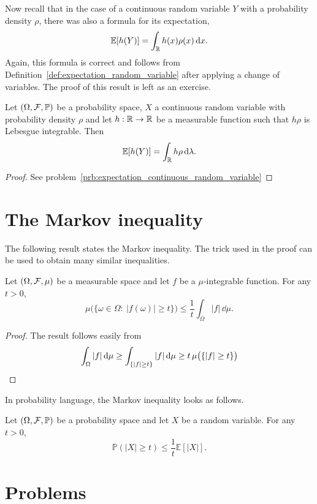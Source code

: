 Now recall that in the case of a continuous random variable $Y$ with a probability density $\rho$, there was also a formula for its expectation,
\[
	\mathbb E[h(Y)] = \int_{\mathbb R} h(x) \rho(x) \, \mathrm{d} x.
\]
Again, this formula is correct and follows from Definition~\ref{def:expectation_random_variable} after applying a change of variables. The proof of this result is left as an exercise.

\begin{lemma}\label{lem:expectation_continuous_random_variable}
Let $(\Omega, \mathcal F, \mathbb{P})$ be a probability space, $X$ a continuous random variable with probability density $\rho$ and let $h : \mathbb R \to \mathbb R$ be a measurable function such that $h \rho$ is Lebesgue integrable. Then
\[
	\mathbb E[h(Y)] = \int_{\mathbb R} h \rho \, \mathrm{d} \lambda.
\]
\end{lemma}

\begin{proof}
See problem~\ref{prb:expectation_continuous_random_variable}
\end{proof}

\section{The Markov inequality}

The following result states the Markov inequality. The trick used in the proof can be used to obtain many similar inequalities.

\begin{lemma}
	Let $(\Omega, \mathcal F, \mu)$ be a measurable space and let $f$ be a $\mu$-integrable function. For any $t>0$,
	\[
	\mu\bigl(\{ \omega \in \Omega : \ |f(\omega)| \geq t \}\bigr) \leq \frac{1}{t} \int_\Omega |f| \,\dd \mu.
	\]
\end{lemma}
\begin{proof} The result follows easily from
	\[
		\int_\Omega |f|\,\mathrm{d} \mu \ge \int_{\{|f|\ge t\}} |f|\,\mathrm{d} \mu \ge t\,\mu\bigl(\{|f|\ge t\}\bigr)  \qedhere
	\]
\end{proof}


In probability language, the Markov inequality looks as follows.

\begin{lemma}
	Let $(\Omega, \mathcal F, \mathbb{P})$ be a probability space and let $X$ be a random variable. For any $t>0$,
	\[
	\mathbb{P}(|X| \geq t) \leq \frac{1}{t} \mathbb{E}[|X|].
	\]
\end{lemma}

\section{Problems}

